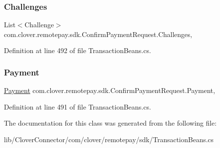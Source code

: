 \subsubsection{\texorpdfstring{Challenges}{Challenges}}
{\footnotesize\ttfamily List$<$Challenge$>$ com.\+clover.\+remotepay.\+sdk.\+Confirm\+Payment\+Request.\+Challenges\hspace{0.3cm}{\ttfamily [get]}, {\ttfamily [set]}}



Definition at line 492 of file Transaction\+Beans.\+cs.

\mbox{\label{classcom_1_1clover_1_1remotepay_1_1sdk_1_1_confirm_payment_request_ac37c417f349cc5ec5222a8d46ca53a1f}} 
\subsubsection{\texorpdfstring{Payment}{Payment}}
{\footnotesize\ttfamily \hyperlink{classcom_1_1clover_1_1sdk_1_1v3_1_1payments_1_1_payment}{Payment} com.\+clover.\+remotepay.\+sdk.\+Confirm\+Payment\+Request.\+Payment\hspace{0.3cm}{\ttfamily [get]}, {\ttfamily [set]}}



Definition at line 491 of file Transaction\+Beans.\+cs.



The documentation for this class was generated from the following file\+:\begin{DoxyCompactItemize}
\item 
lib/\+Clover\+Connector/com/clover/remotepay/sdk/Transaction\+Beans.\+cs\end{DoxyCompactItemize}
